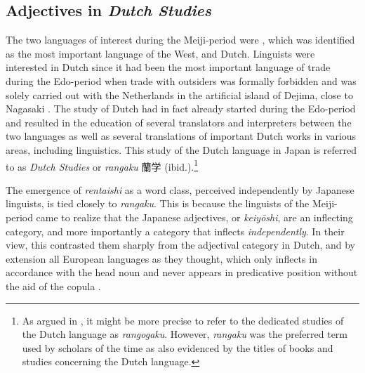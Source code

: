 \documentclass[output=paper,colorlinks,citecolor=brown]{langscibook}
\begin{document}
\subsection{Adjectives in \emph{Dutch Studies}} \label{12sec4.2}

The two languages of interest during the Meiji-period were , which was identified as the most important language of the West, and Dutch. Linguists were interested in Dutch since it had been the most important language of trade during the Edo-period when trade with outsiders was formally forbidden and was solely carried out with the Netherlands in the artificial island of Dejima, close to Nagasaki \citep{sugimoto1967, sugimoto1991, nespoli2023}. The study of Dutch had in fact already started during the Edo-period and resulted in the education of several translators and interpreters between the two languages as well as several translations of important Dutch works in various areas, including linguistics. This study of the Dutch language in Japan is referred to as \emph{Dutch Studies} or \emph{rangaku} {\japanesefont 蘭学} (ibid.).\footnote{As argued in \citet[48]{nespoli2023}, it might be more precise to refer to the dedicated studies of the Dutch language as \emph{rangogaku}. However, \emph{rangaku} was the preferred term used by scholars of the time as also evidenced by the titles of books and studies concerning the Dutch language.}

The emergence of \emph{rentaishi} as a word class, perceived independently by Japanese linguists, is tied closely to \emph{rangaku}. This is because the linguists of the Meiji-period came to realize that the Japanese adjectives, or \emph{keiyōshi}, are an inflecting category, and more importantly a category that inflects \emph{independently}. In their view, this contrasted them sharply from the adjectival category in Dutch, and by extension all European languages as they thought, which only inflects in accordance with the head noun and never appears in predicative position without the aid of the copula \citep{kim2006}.
\end{document}
